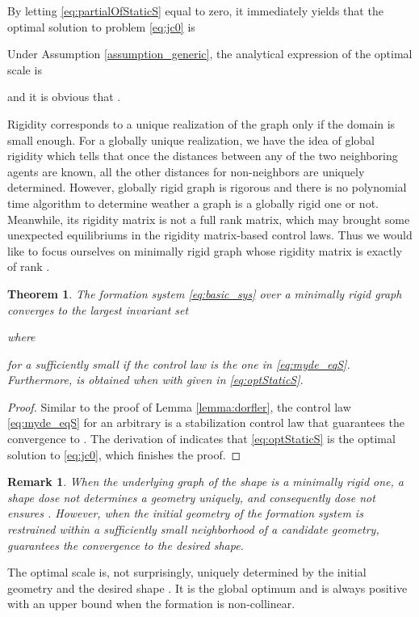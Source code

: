 \documentclass[times]{rncauth}
\newtheorem{thm}{Theorem}[section]
\newtheorem{rem}{Remark}[section]
\begin{document}
  By letting \eqref{eq:partialOfStaticS} equal to zero, it immediately yields
  that the optimal  solution  to problem \eqref{eq:jc0} is
  
  Under Assumption \ref{assumption_generic}, the analytical expression of the optimal scale is
  
  and it is obvious that .


Rigidity corresponds to a unique realization of the graph only if
the domain is small enough. For a globally unique realization, we
have the idea of global rigidity\cite{Anderson08rigidMagazine} which
tells that once the distances between any of the two neighboring
agents are known, all the other distances for non-neighbors are
uniquely determined. However, globally rigid graph is rigorous and
there is no polynomial time algorithm to determine weather a graph
is a globally rigid one or not. Meanwhile, its rigidity matrix is
not a full rank matrix, which may brought some unexpected
equilibriums in the rigidity matrix-based control laws. Thus we
would like to focus ourselves on minimally rigid graph whose
rigidity matrix is exactly of rank .


\begin{thm}
The formation system \eqref{eq:basic_sys} over a minimally rigid
graph converges to the largest invariant set

where

for a sufficiently small  if the control law  is the one in
\eqref{eq:myde_eqS}. Furthermore,  is obtained when
 with  given in \eqref{eq:optStaticS}.
\end{thm}
\begin{proof}
  Similar to the proof of Lemma \ref{lemma:dorfler},
  the control law \eqref{eq:myde_eqS} for an arbitrary  
   is a stabilization control law that guarantees the convergence to
   .
The derivation of  indicates that \eqref{eq:optStaticS} is
the optimal solution to \eqref{eq:jc0}, which finishes the proof.
\end{proof}
\begin{rem}\label{rem:initial}
 When the underlying graph  of the  shape is a minimally rigid
one, a shape  dose not determines a geometry uniquely, and
consequently  dose not ensures
. However, when the initial
geometry  of the formation system is restrained within
a sufficiently small neighborhood  of a candidate
geometry,  guarantees the convergence to the
desired shape.
\end{rem}

The optimal scale  is, not surprisingly, uniquely determined
by the initial geometry  and the desired shape . It
is the global optimum and is always positive with an upper bound
when the formation is non-collinear.
\end{document}
